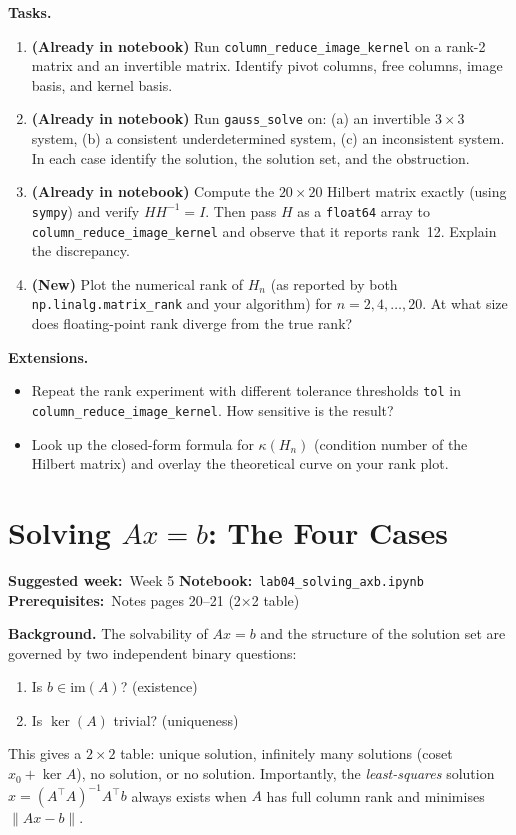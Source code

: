 \documentclass[11pt, a4paper]{article}
\newcommand{\labmeta}[3]{%
  \begin{prereqbox}
  \textbf{Suggested week:}~#1 \quad
  \textbf{Notebook:}~\texttt{#2} \quad
  \textbf{Prerequisites:}~#3
  \end{prereqbox}
  \vspace{4pt}
}
\newcommand{\tasks}[1]{%
  \begin{taskbox}
  \textbf{\color{taskcolor}Tasks.}
  \begin{enumerate}[leftmargin=1.6em, itemsep=3pt] #1 \end{enumerate}
  \end{taskbox}
}
\newcommand{\extensions}[1]{%
  \textbf{\color{notecolor}Extensions.}
  \begin{itemize}[leftmargin=1.6em, itemsep=1pt] #1 \end{itemize}
}
\begin{document}
\tasks{
  \item \textbf{(Already in notebook)} Run \texttt{column\_reduce\_image\_kernel} on
        a rank-2 matrix and an invertible matrix. Identify pivot columns, free columns,
        image basis, and kernel basis.
  \item \textbf{(Already in notebook)} Run \texttt{gauss\_solve} on:
        (a) an invertible $3\times3$ system, (b) a consistent underdetermined system,
        (c) an inconsistent system. In each case identify the solution, the solution set,
        and the obstruction.
  \item \textbf{(Already in notebook)} Compute the $20\times 20$ Hilbert matrix exactly
        (using \texttt{sympy}) and verify $H H^{-1} = I$. Then pass $H$ as a
        \texttt{float64} array to \texttt{column\_reduce\_image\_kernel} and observe
        that it reports rank~12. Explain the discrepancy.
  \item \textbf{(New)} Plot the numerical rank of $H_n$ (as reported by both
        \texttt{np.linalg.matrix\_rank} and your algorithm) for $n = 2, 4, \ldots, 20$.
        At what size does floating-point rank diverge from the true rank?
}

\extensions{
  \item Repeat the rank experiment with different tolerance thresholds \texttt{tol} in
        \texttt{column\_reduce\_image\_kernel}. How sensitive is the result?
  \item Look up the closed-form formula for $\kappa(H_n)$ (condition number of the
        Hilbert matrix) and overlay the theoretical curve on your rank plot.
}

\section{Solving $Ax = b$: The Four Cases}
\label{lab:axb}

\labmeta{Week 5}{lab04\_solving\_axb.ipynb}{Notes pages 20--21 (2×2 table)}

\vspace{4pt}

\noindent\textbf{Background.}
The solvability of $Ax = b$ and the structure of the solution set are
governed by two independent binary questions:
\begin{enumerate}[itemsep=0pt]
  \item Is $b \in \mathrm{im}(A)$? (existence)
  \item Is $\ker(A)$ trivial? (uniqueness)
\end{enumerate}
This gives a $2\times 2$ table: unique solution, infinitely many solutions
(coset $x_0 + \ker A$), no solution, or no solution. Importantly, the
\emph{least-squares} solution $\hat x = (A^\top A)^{-1}A^\top b$ always
exists when $A$ has full column rank and minimises $\|Ax - b\|$.
\end{document}
